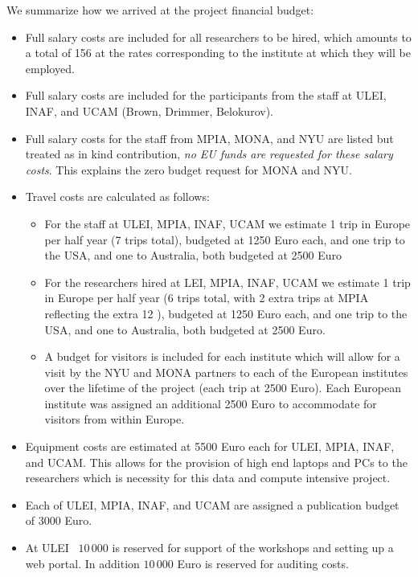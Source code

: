 We summarize how we arrived at the project financial budget:
\begin{itemize}
    \item Full salary costs are included for all researchers to be hired, which amounts to a total of 156 {\pems} at the rates corresponding to the institute at which they will be employed.
    \item Full salary costs are included for the participants from the staff at ULEI, INAF, and UCAM (Brown, Drimmer, Belokurov).
    \item Full salary costs for the staff from MPIA, MONA, and NYU are listed but treated as in kind contribution, \emph{no EU funds are requested for these salary costs}. This explains the zero budget request for MONA and NYU.
    \item Travel costs are calculated as follows:
    \begin{itemize}
        \item For the staff at ULEI, MPIA, INAF, UCAM we estimate 1 trip in Europe per half year (7 trips total), budgeted at 1250 Euro each, and one trip to the USA, and one to Australia, both budgeted at 2500 Euro
        \item For the researchers hired at LEI, MPIA, INAF, UCAM we estimate 1 trip in Europe per half year (6 trips total, with 2 extra trips at MPIA reflecting the extra 12 \pems), budgeted at 1250 Euro each, and one trip to the USA, and one to Australia, both budgeted at 2500 Euro.
        \item A budget for visitors is included for each institute which will allow for a visit by the NYU and MONA partners to each of the European institutes over the lifetime of the project (each trip at 2500 Euro). Each European institute was assigned an additional 2500 Euro to accommodate for visitors from within Europe.
    \end{itemize}
    \item Equipment costs are estimated at 5500 Euro each for ULEI, MPIA, INAF, and UCAM. This allows for the provision of high end laptops and PCs to the researchers which is necessity for this data and compute intensive project.
    \item Each of ULEI, MPIA, INAF, and UCAM are assigned a publication budget of 3000 Euro.
    \item At ULEI \EUR\ $10\,000$ is reserved for support of the workshops and setting up a web portal. In addition $10\,000$ Euro is reserved for auditing costs.
\end{itemize}

